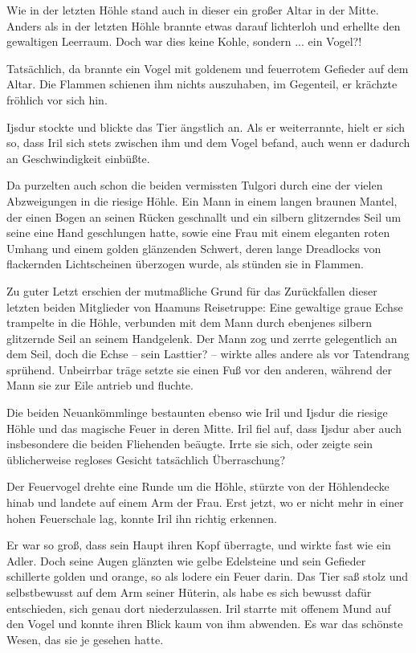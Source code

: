 Wie in der letzten Höhle stand auch in dieser ein großer Altar in der Mitte. Anders als in der letzten Höhle brannte etwas darauf lichterloh und erhellte den gewaltigen Leerraum. Doch war dies keine Kohle, sondern ... ein Vogel?!

Tatsächlich, da brannte ein Vogel mit goldenem und feuerrotem Gefieder auf dem Altar. Die Flammen schienen ihm nichts auszuhaben, im Gegenteil, er krächzte fröhlich vor sich hin.

Ijsdur stockte und blickte das Tier ängstlich an. Als er weiterrannte, hielt er sich so, dass Iril sich stets zwischen ihm und dem Vogel befand, auch wenn er dadurch an Geschwindigkeit einbüßte.

Da purzelten auch schon die beiden vermissten Tulgori durch eine der vielen Abzweigungen in die riesige Höhle. Ein Mann in einem langen braunen Mantel, der einen Bogen an seinen Rücken geschnallt und ein silbern glitzerndes Seil um seine eine Hand geschlungen hatte, sowie eine Frau mit einem eleganten roten Umhang und einem golden glänzenden Schwert, deren lange Dreadlocks von flackernden Lichtscheinen überzogen wurde, als stünden sie in Flammen.

Zu guter Letzt erschien der mutmaßliche Grund für das Zurückfallen dieser letzten beiden Mitglieder von Haamuns Reisetruppe: Eine gewaltige graue Echse trampelte in die Höhle, verbunden mit dem Mann durch ebenjenes silbern glitzernde Seil an seinem Handgelenk. Der Mann zog und zerrte gelegentlich an dem Seil, doch die Echse – sein Lasttier? – wirkte alles andere als vor Tatendrang sprühend. Unbeirrbar träge setzte sie einen Fuß vor den anderen, während der Mann sie zur Eile antrieb und fluchte.

Die beiden Neuankömmlinge bestaunten ebenso wie Iril und Ijsdur die riesige Höhle und das magische Feuer in deren Mitte. Iril fiel auf, dass Ijsdur aber auch insbesondere die beiden Fliehenden beäugte. Irrte sie sich, oder zeigte sein üblicherweise regloses Gesicht tatsächlich Überraschung?

Der Feuervogel drehte eine Runde um die Höhle, stürzte von der Höhlendecke hinab und landete auf einem Arm der Frau. Erst jetzt, wo er nicht mehr in einer hohen Feuerschale lag, konnte Iril ihn richtig erkennen.

Er war so groß, dass sein Haupt ihren Kopf überragte, und wirkte fast wie ein Adler. Doch seine Augen glänzten wie gelbe Edelsteine und sein Gefieder schillerte golden und orange, so als lodere ein Feuer darin. Das Tier saß stolz und selbstbewusst auf dem Arm seiner Hüterin, als habe es sich bewusst dafür entschieden, sich genau dort niederzulassen. Iril starrte mit offenem Mund auf den Vogel und konnte ihren Blick kaum von ihm abwenden. Es war das schönste Wesen, das sie je gesehen hatte.

